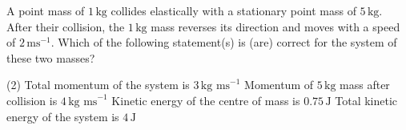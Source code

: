 
\item A point mass of \(1 \, \text{kg}\) collides elastically with a stationary point mass of \(5 \, \text{kg}\). After their collision, the \(1 \, \text{kg}\) mass reverses its direction and moves with a speed of \(2 \, \text{ms}^{-1}\). Which of the following statement(s) is (are) correct for the system of these two masses?
    \begin{tasks}(2)
        \task Total momentum of the system is \(3 \, \text{kg ms}^{-1}\)
        \task Momentum of \(5 \, \text{kg}\) mass after collision is \(4 \, \text{kg ms}^{-1}\)
        \task Kinetic energy of the centre of mass is \(0.75 \, \text{J}\)
        \task Total kinetic energy of the system is \(4 \, \text{J}\)
    \end{tasks}
